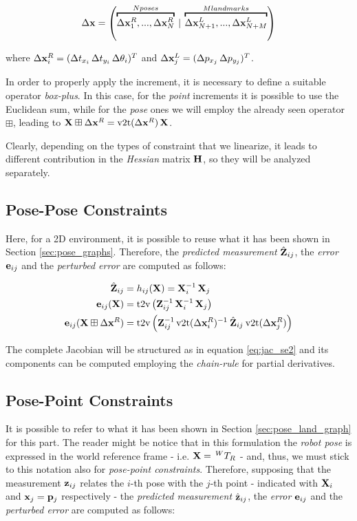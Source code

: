 \begin{equation}
    \dx = \left(\overbracket{\dx^R_1, ..., \dx^R_N}^{N poses}\: |\: \overbracket{\dx^L_{N+1}, ..., \dx^L_{N+M}}^{M landmarks}\right)
    \label{eq:increments_ba_2d}
\end{equation}

\noindent where $\Delta \mathbf{x}^R_i = (\Delta t_{x_i}\, \Delta t_{y_i}\, \Delta \theta_i)^T$ and $\Delta \mathbf{x}^L_j = (\Delta p_{x_j}\, \Delta p_{y_j})^T$.

In order to properly apply the increment, it is necessary to define a suitable operator \textit{box-plus}. In this case, for the \textit{point} increments it is possible to use the Euclidean sum, while for the \textit{pose} ones we will employ the already seen operator $\boxplus$, leading to $\SState \boxplus \dx^R = \v2t(\dx^R)\, \SState$.

Clearly, depending on the types of constraint that we linearize, it leads to different contribution in the \textit{Hessian} matrix $\mathbf{H}$, so they will be analyzed separately.

\subsection{Pose-Pose Constraints}\label{subsec:pose_pose_constraints_2d}
Here, for a 2D environment, it is possible to reuse what it has been shown in Section \ref{sec:pose_graphs}. Therefore, the \textit{predicted measurement} $\hat{\mathbf{Z}}_{ij}$, the \textit{error} $\mathbf{e}_{ij}$ and the \textit{perturbed error} are computed as follows:

\begin{align*}
    \Pred_{ij} &= h_{ij}(\SState) = \SState_i^{-1}\, \SState_j \\
    \error_{ij}(\SState) &= \text{t2v}\left(\Meas_{ij}^{-1}\,\SState_i^{-1}\, \SState_j\right) \\
    \error_{ij}(\SState \boxplus \dx^R) &= \text{t2v}\left(\Meas_{ij}^{-1} \, \v2t(\dx^R_i)^{-1}\: \Pred_{ij} \:\v2t(\dx^R_j) \right)
\end{align*}

\noindent The complete Jacobian will be structured as in equation \ref{eq:jac_se2} and its components can be computed employing the \textit{chain-rule} for partial derivatives.

\subsection{Pose-Point Constraints}\label{subsec:pose_point_constraints_2d}
It is possible to refer to what it has been shown in Section \ref{sec:pose_land_graph} for this part. The reader might be notice that in this formulation the \textit{robot pose} is expressed in the world reference frame - i.e. $\mathbf{X} =\, ^{W}T_{R}$ - and, thus, we must stick to this notation also for \textit{pose-point constraints}. Therefore, supposing that the measurement $\mathbf{z}_{ij}$ relates the $i$-th pose with the $j$-th point - indicated with $\mathbf{X}_i$ and $\mathbf{x}_j = \mathbf{p}_j$ respectively - the \textit{predicted measurement} $\hat{\mathbf{z}}_{ij}$, the \textit{error} $\mathbf{e}_{ij}$ and the \textit{perturbed error} are computed as follows:

